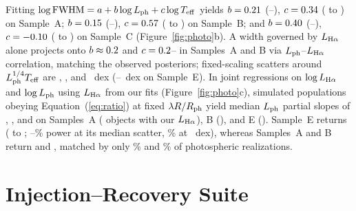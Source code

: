 \documentclass[twocolumn,linenumbers]{aastex701}
\newcommand{\LHa}{L_{\rm H\alpha}}
\newcommand{\Lph}{L_{\rm ph}}
\newcommand{\Rph}{R_{\rm ph}}
\newcommand{\Teff}{T_{\rm eff}}
\begin{document}
Fitting $\log{\rm FWHM}=a+b\log\Lph+c\log\Teff$ yields $b=0.21{}$ (\bPAlo{}--\bPAhi{}), $c=0.34{}$ (\cPAlo{} to \cPAhi{}) on Sample~A; $b=0.15{}$ (\bPBlo{}--\bPBhi{}), $c=0.57{}$ (\cPBlo{} to \cPBhi{}) on Sample~B; and $b=0.40{}$ (\bPClo{}--\bPChi{}), $c=-0.10{}$ (\cPClo{} to \cPChi{}) on Sample~C (Figure~\ref{fig:photo}b).
A width governed by $\LHa$ alone projects onto $b\approx0.2{}$ and $c=0.2{}$--\lineCHi{} in Samples~A and B via $\Lph$--$\LHa$ correlation, matching the observed posteriors; fixed-scaling scatters around $\Lph^{1/4}\Teff$ are \sqPA{}, \sqPB{}, and \sqPC{}~dex (\sqPElo{}--\sqPEhi{}~dex on Sample~E).
In joint regressions on $\log\LHa$ and $\log\Lph$ using $\LHa$ from our fits (Figure~\ref{fig:photo}c), simulated populations obeying Equation~(\ref{eq:ratio}) at fixed $\lambda R/\Rph$ yield median $\Lph$ partial slopes of \simMedJA{}, \simMedJB{}, and \simMedJE{} on Samples~A (\NJA{} objects with our $\LHa$), B (\NJB{}), and E (\NJE{}).
Sample~E returns \bpJE{} (\bpJElo{} to \bpJEhi{}; \powLo{}--\powHi{}\% power at its median scatter, \powTen{}\% at \simA{}~dex), whereas Samples~A and B return \bpJA{} and \bpJB{}, matched by only \simPctJA{}\% and \simPctJB{}\% of photospheric realizations.

\section{Injection--Recovery Suite} \label{app:injections}
\end{document}
